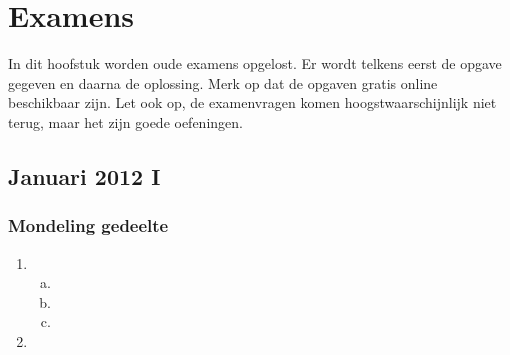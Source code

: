 \documentclass[main.tex]{subfiles}
\begin{document}
\chapter{Examens}
\label{cha:examens}
In dit hoofstuk worden oude examens opgelost.
Er wordt telkens eerst de opgave gegeven en daarna de oplossing.
Merk op dat de opgaven gratis online beschikbaar zijn.
Let ook op, de examenvragen komen hoogstwaarschijnlijk niet terug, maar het zijn goede oefeningen.




\section{Januari 2012 I}

\subsection*{Mondeling gedeelte}
\begin{enumerate}
\item
  \begin{enumerate}[(a)]
  \item \TODO{}
  \item \TODO{}
  \item \TODO{}
  \end{enumerate}
\item \TODO{}
\end{enumerate}
\end{document}
